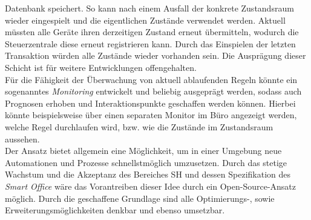     Datenbank speichert. So kann nach einem Ausfall der konkrete Zustandsraum wieder eingespielt und die eigentlichen Zustände verwendet werden. Aktuell müssten alle Geräte ihren derzeitigen Zustand erneut übermitteln, wodurch 
    die Steuerzentrale diese erneut registrieren kann. Durch das Einspielen der letzten Transaktion würden alle Zustände wieder vorhanden sein. Die Ausprägung dieser Schicht ist für weitere Entwicklungen offengehalten. 
    \\
    \linebreak
    Für die Fähigkeit der Überwachung von aktuell ablaufenden Regeln könnte ein sogenanntes \textit{Monitoring} entwickelt und beliebig ausgeprägt werden, sodass auch Prognosen erhoben und Interaktionspunkte geschaffen 
    werden können. Hierbei könnte beispielsweise über einen separaten Monitor im Büro angezeigt werden, welche Regel durchlaufen wird, bzw. wie die Zustände im Zustandsraum aussehen. 
    \\
    \linebreak
    Der Ansatz bietet allgemein eine Möglichkeit, um in einer Umgebung neue Automationen und Prozesse schnellstmöglich umzusetzen. Durch das stetige Wachstum und die Akzeptanz des Bereiches \acl{SH} und dessen Spezifikation des 
    \textit{Smart Office} wäre das Vorantreiben dieser Idee durch ein Open-Source-Ansatz möglich. Durch die geschaffene Grundlage sind alle Optimierungs-, sowie Erweiterungsmöglichkeiten denkbar und ebenso umsetzbar. 
    



